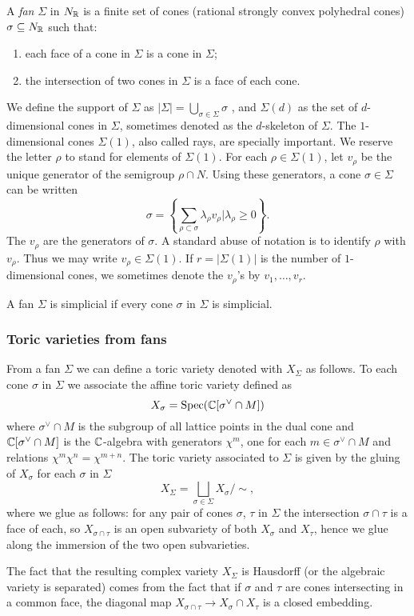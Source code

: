 \documentclass[../main.tex]{subfiles}
\begin{document}
A \emph{fan} $\Sigma$ in $N_{\mathbb{R}}$ is a finite set of cones (rational strongly convex polyhedral cones) $\sigma \subseteq N_{\mathbb{R}}$ such that:
\begin{enumerate}
    \item each face of a cone in $\Sigma$ is a cone in $\Sigma$;
\item the intersection of two cones in $\Sigma$ is a face of each cone.
\end{enumerate}
We define the support of $\Sigma$ as $| \Sigma | = \bigcup_{ \sigma \in \Sigma} \sigma$ , and $\Sigma(d)$ as the set of $d$-dimensional cones in $\Sigma$, sometimes denoted as the $d$-skeleton of $\Sigma$.
The $1$-dimensional cones $\Sigma(1)$, also called rays, are specially important. We reserve the letter $\rho$ to stand for elements of $\Sigma(1)$. For each $\rho \in \Sigma(1)$, let $v_\rho$ be the unique generator of the semigroup $\rho \cap N$. Using these generators, a cone $\sigma \in \Sigma$ can be written
\[
\sigma = \left \{ \sum_{\rho \subset \sigma} \lambda_\rho v_\rho | \lambda_\rho \geq 0 \right \}.
\]
The $v_\rho$ are the generators of $\sigma$. A standard abuse of notation is to identify $\rho$ with $v_\rho$. Thus we may write $v_\rho \in \Sigma(1)$. If $r=| \Sigma(1)|$ is the number of $1$-dimensional cones, we sometimes denote the $v_\rho$'s by $v_1, \dots, v_r$.  
\begin{defn}
    A fan $\Sigma$ is simplicial if every cone  $\sigma$ in  $\Sigma$ is simplicial.
\end{defn}

\subsubsection{Toric varieties from fans}

\begin{defn}
From a fan $\Sigma$ we can define a toric variety denoted with $X_\Sigma$ as follows.
To each cone $\sigma$ in $\Sigma$ we associate the affine toric variety defined as
\[
X_\sigma = \operatorname{Spec}(\mathbb{C}[\sigma^\vee \cap M])
\]
where $\sigma^\vee \cap M$ is the subgroup of all lattice points in the dual cone and $\mathbb{C}[\sigma^\vee \cap M]$ is the $\mathbb{C}$-algebra with generators $\chi^m$, one for each $m \in \sigma^\vee \cap M$ and relations $\chi^m \chi^n = \chi^{m+n} $.
The toric variety associated to $\Sigma$ is given by the gluing of $X_\sigma$ for each $\sigma$ in $\Sigma$
\[
X_\Sigma = \bigsqcup_{\sigma \in \Sigma} X_\sigma / \sim  ,
\]
where we glue as follows: for any pair of cones $\sigma$, $\tau$ in $\Sigma$ the intersection $\sigma \cap \tau$ is a face of each, so
$X_{\sigma \cap \tau}$ is an open subvariety of both $X_\sigma$ and $X_\tau$, hence we glue along the immersion of the two open subvarieties.
\end{defn}
The fact that the resulting complex variety $X_\Sigma$ is Hausdorff (or the algebraic variety is separated) comes from the fact that if $\sigma $ and $\tau$ are cones intersecting in a common face, the diagonal map $X_{\sigma \cap \tau} \to X_\sigma \cap X_\tau$ is a closed embedding.
\end{document}
